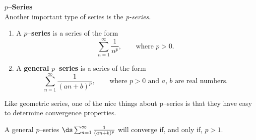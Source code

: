 \noindent\textbf{\large $p$--Series}\\

Another important type of series is the \emph{p-series}.

{\begin{enumerate}
\item	A \textbf{$p$--series} is a series of the form $$\sum_{n=1}^\infty \frac{1}{n^p}, \qquad \text{where $p>0$.}$$

\item	A \textbf{general $p$--series} is a series of the form 
$$\sum_{n=1}^\infty \frac{1}{(an+b)^p}, \qquad \text{where $p>0$ and $a$, $b$ are real numbers.}$$
\end{enumerate}
}

Like geometric series, one of the nice things about p--series is that they have easy to determine convergence properties.

{A general $p$--series $\ds\sum_{n=1}^\infty \frac{1}{(an+b)^p}$ will converge if, and only if, $p>1$.
}
\pagebreak

